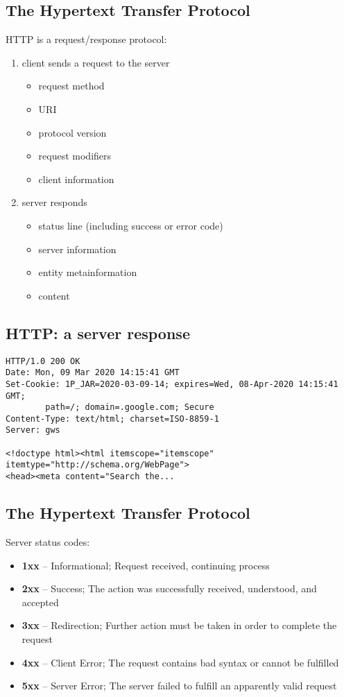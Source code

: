 \documentclass[xga]{xdvislides}
\begin{document}
\subsection{The Hypertext Transfer Protocol}
HTTP is a request/response protocol:
\begin{enumerate}
	\item client sends a request to the server
		\begin{itemize}
			\item request method
			\item URI
			\item protocol version
			\item request modifiers
			\item client information
		\end{itemize}
	\item server responds
		\begin{itemize}
			\item status line (including success or error code)
			\item server information
			\item entity metainformation
			\item content
		\end{itemize}
\end{enumerate}

\subsection{HTTP: a server response}
\begin{verbatim}
HTTP/1.0 200 OK
Date: Mon, 09 Mar 2020 14:15:41 GMT
Set-Cookie: 1P_JAR=2020-03-09-14; expires=Wed, 08-Apr-2020 14:15:41 GMT;
        path=/; domain=.google.com; Secure
Content-Type: text/html; charset=ISO-8859-1
Server: gws

<!doctype html><html itemscope="itemscope" itemtype="http://schema.org/WebPage">
<head><meta content="Search the...

\end{verbatim}

\subsection{The Hypertext Transfer Protocol}
Server status codes:
\begin{itemize}
	\item {\bf 1xx} -- Informational; Request received, continuing process
	\item {\bf 2xx} -- Success; The action was successfully received,
        understood, and accepted
	\item {\bf 3xx} -- Redirection; Further action must be taken in order to
        complete the request
	\item {\bf 4xx} -- Client Error; The request contains bad syntax or
		cannot be fulfilled
	\item {\bf 5xx} -- Server Error; The server failed to fulfill an
		apparently valid request
\end{itemize}
\end{document}
